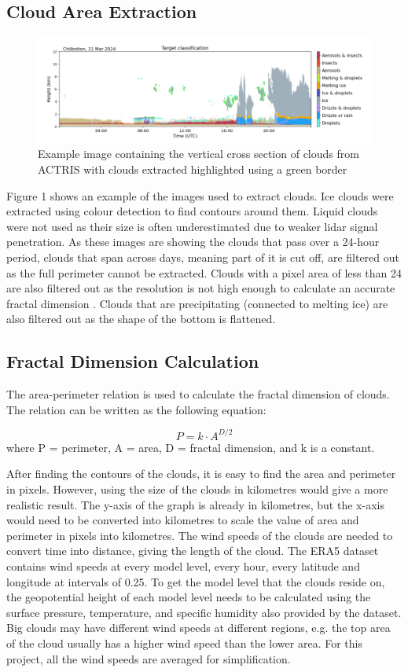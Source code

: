 \documentclass[titlepage]{article}
\begin{document}
\subsection{Cloud Area Extraction}

\begin{figure}[h]
    \centering
    \includegraphics[width=0.75\linewidth]{fig1.png}
    \caption{Example image containing the vertical cross section of clouds from ACTRIS with clouds extracted highlighted using a green border}
    \label{fig:enter-label}
\end{figure}

Figure 1 shows an example of the images used to extract clouds. Ice clouds were extracted using colour detection to find contours around them. Liquid clouds were not used as their size is often underestimated due to weaker lidar signal penetration. As these images are showing the clouds that pass over a 24-hour period, clouds that span across days, meaning part of it is cut off, are filtered out as the full perimeter cannot be extracted. Clouds with a pixel area of less than 24 are also filtered out as the resolution is not high enough to calculate an accurate fractal dimension \cite{christensen2021fractal}. Clouds that are precipitating (connected to melting ice) are also filtered out as the shape of the bottom is flattened.

\subsection{Fractal Dimension Calculation}

The area-perimeter relation is used to calculate the fractal dimension of clouds. The relation can be written as the following equation:

\[P=k\cdot A^{D/2}\]
where P = perimeter, A = area, D = fractal dimension, and k is a constant.

After finding the contours of the clouds, it is easy to find the area and perimeter in pixels. However, using the size of the clouds in kilometres would give a more realistic result. The y-axis of the graph is already in kilometres, but the x-axis would need to be converted into kilometres to scale the value of area and perimeter in pixels into kilometres. The wind speeds of the clouds are needed to convert time into distance, giving the length of the cloud. The ERA5 dataset contains wind speeds at every model level, every hour, every latitude and longitude at intervals of 0.25\degree. To get the model level that the clouds reside on, the geopotential height of each model level needs to be calculated using the surface pressure, temperature, and specific humidity also provided by the dataset. Big clouds may have different wind speeds at different regions, e.g. the top area of the cloud usually has a higher wind speed than the lower area. For this project, all the wind speeds are averaged for simplification.
\end{document}
